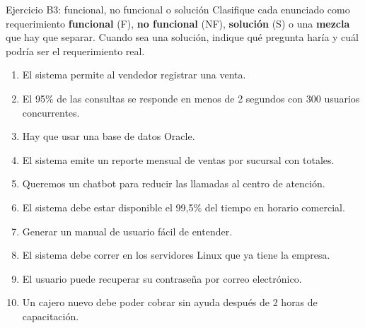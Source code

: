 \documentclass[11pt,a4paper]{article}
\begin{document}
\begin{enunciado}{Ejercicio B3: funcional, no funcional o solución}
Clasifique cada enunciado como requerimiento \textbf{funcional} (F), \textbf{no funcional} (NF),
\textbf{solución} (S) o una \textbf{mezcla} que hay que separar. Cuando sea una solución, indique qué
pregunta haría y cuál podría ser el requerimiento real.
\begin{enumerate}
  \item El sistema permite al vendedor registrar una venta.
  \item El 95\% de las consultas se responde en menos de 2 segundos con 300 usuarios concurrentes.
  \item Hay que usar una base de datos Oracle.
  \item El sistema emite un reporte mensual de ventas por sucursal con totales.
  \item Queremos un chatbot para reducir las llamadas al centro de atención.
  \item El sistema debe estar disponible el 99,5\% del tiempo en horario comercial.
  \item Generar un manual de usuario fácil de entender.
  \item El sistema debe correr en los servidores Linux que ya tiene la empresa.
  \item El usuario puede recuperar su contraseña por correo electrónico.
  \item Un cajero nuevo debe poder cobrar sin ayuda después de 2 horas de capacitación.
\end{enumerate}
\end{enunciado}

\end{document}
